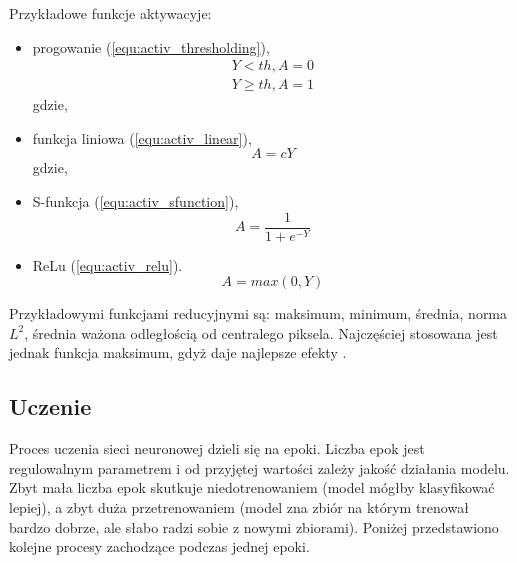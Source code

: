 {Przykładowe funkcje aktywacyje:
\begin{itemize}
\item progowanie (\ref{equ:activ_thresholding}),
\begin{equation}
\begin{aligned}
Y < th, A = 0\\
Y \geq th, A = 1
\end{aligned}
\label{equ:activ_thresholding}
\end{equation}
gdzie,
\item funkcja liniowa (\ref{equ:activ_linear}),
\begin{equation}
A = cY
\label{equ:activ_linear}
\end{equation}
gdzie,
\item S-funkcja (\ref{equ:activ_sfunction}),
\begin{equation}
A = \frac{1}{1+e^{-Y}}
\label{equ:activ_sfunction}
\end{equation}
\item ReLu (\ref{equ:activ_relu}).
\begin{equation}
A = max(0,Y)
\label{equ:activ_relu}
\end{equation}
\end{itemize}

Przykładowymi funkcjami reducyjnymi są: maksimum, minimum, średnia, norma \begin{math}L^{2}\end{math}, średnia ważona odległością od centralego piksela. Najczęściej stosowana jest jednak funkcja maksimum, gdyż daje najlepsze efekty \cite{Scherer2010EvaluationOP}.
}

\subsection{Uczenie}
Proces uczenia sieci neuronowej dzieli się na epoki. Liczba epok jest regulowalnym parametrem i od przyjętej wartości zależy jakość działania modelu. Zbyt mała liczba epok skutkuje niedotrenowaniem (model mógłby klasyfikować lepiej), a zbyt duża przetrenowaniem (model zna zbiór na którym trenował bardzo dobrze, ale słabo radzi sobie z nowymi zbiorami). Poniżej przedstawiono kolejne procesy zachodzące podczas jednej epoki.

